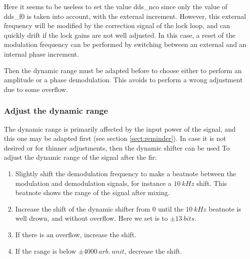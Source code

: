 \documentclass[12pt,oneside]{article}
\begin{document}
Here it seems to be useless to set the value dds\_nco since only the value of dds\_f0 is taken into account, with the external increment. However, this external frequency will be modified by the correction signal of the lock loop, and can quickly drift if the lock gains are not well adjusted. In this case, a reset of the modulation frequency can be performed by switching between an external and an internal phase increment. 
\newline

Then the dynamic range must be adapted before to choose either to perform an amplitude or a phase demodulation. This avoids to perform a wrong adjustment due to some overflow.

\subsubsection{Adjust the dynamic range}

The dynamic range is primarily affected by the input power of the signal, and this one may be adapted first (see section \ref{sect:reminder}). In case it is not desired or for thinner adjustments, then the dynamic shifter can be used To adjust the dynamic range of the signal after the fir: 

\vspace{0.3cm}
\begin{enumerate}
	\setlength\itemsep{-0.1cm}
	\item Slightly shift the demodulation frequency to make a beatnote between the modulation and demodulation signals, for instance a $10~kHz$ shift. This beatnote shows the range of the signal after mixing. 
	\item Increase the shift of the dynamic shifter from $0$ until the $10~kHz$ beatnote is well drown, and without overflow. Here we set is to $\pm 13~bits$.
	\item If there is an overflow, increase the shift.
	\item If the range is below $\pm 4000~arb.~unit$, decrease the shift.
\end{enumerate}
\vspace{0.3cm}
\end{document}
